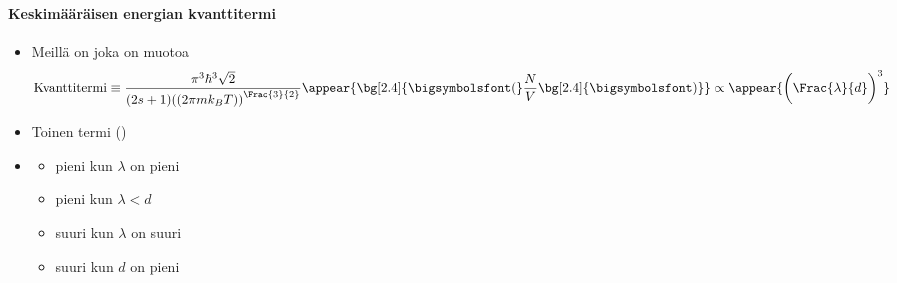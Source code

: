 \begin{frame}
\frametitle{\texorpdfstring{\culine[\sectiontitleulinecolor]{\sectiontitle}}{\sectiontitle} }
\framesubtitle{Keskimääräisen energian kvanttitermi}
\appear{}
\begin{itemize}
	
\item Meillä on  joka on muotoa 
\[
\text {Kvanttitermi}  \equiv \frac{\pi^{3} \hbar^{3} \sqrt{2}}{(2 s+1) \textrm{((}2 \pi m k_{B} T \textrm{))}^{\Frac{3}{2}}} \appear{ \bg[2.4]{\text{\bigsymbolsfont(}} \frac{N}{V} \bg[2.4]{\text{\bigsymbolsfont)}} } \propto \appear{ \bigg( \Frac{\lambda}{d}  \bigg)^{3}}
\]

\item Toinen termi ()   
\item[] \begin{itemize}[itemsep=3.5mm]
	 \item pieni kun $\lambda$ on pieni
\item pieni kun $\lambda<d$
\item suuri kun  $\lambda$ on suuri
\item suuri kun $d$ on pieni
\end{itemize}


\end{itemize}


\endofslide 
\end{frame}

